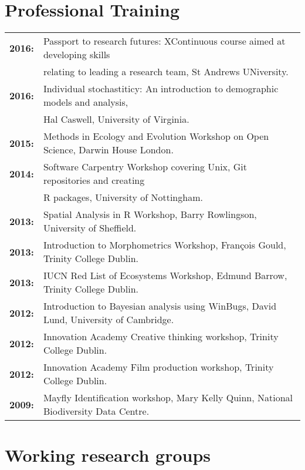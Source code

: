 \documentclass[10pt,a4paper]{article}
\begin{document}
\begin{flushleft}
\section{Professional Training}
\begin{tabular}{ll}
\textbf{2016:} & Passport to research futures: XContinuous course aimed at developing skills\\ 
&relating to leading a research team, St Andrews UNiversity.\\
\textbf{2016:} & Individual stochastiticy: An introduction to demographic models and analysis,\\ 
&Hal Caswell, University of Virginia.\\
\textbf{2015:} & Methods in Ecology and Evolution Workshop on Open Science, Darwin House London.\\
\textbf{2014:} & Software Carpentry Workshop covering Unix, Git repositories and creating\\
&R packages, University of Nottingham.\\
\textbf{2013:} & Spatial Analysis in R Workshop, Barry Rowlingson, University of Sheffield.\\
\textbf{2013:} & Introduction to Morphometrics Workshop, François Gould, Trinity College Dublin.\\
\textbf{2013:} & IUCN Red List of Ecosystems Workshop, Edmund Barrow, Trinity College Dublin.\\
\textbf{2012:} & Introduction to Bayesian analysis using WinBugs, David Lund, University of Cambridge.\\
\textbf{2012:} & Innovation Academy Creative thinking workshop, Trinity College Dublin.\\
\textbf{2012:} & Innovation Academy Film production workshop, Trinity College Dublin.\\
\textbf{2009:} & Mayfly Identification workshop, Mary Kelly Quinn, National Biodiversity Data Centre.\\
\end{tabular}


\section{Working research groups}


\end{flushleft}
\end{document}
